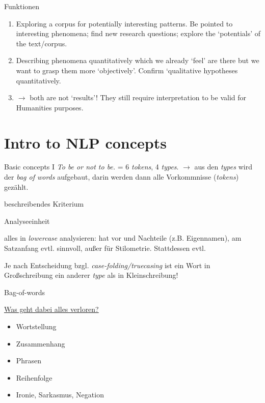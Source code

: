 \documentclass[10pt]{beamer}
\begin{document}
\begin{frame}{Funktionen}
\begin{enumerate}
    \item {} Exploring a corpus for potentially interesting patterns. Be pointed to interesting phenomena; find new research questions; explore the `potentials' of the text/corpus.
    \item {} Describing phenomena quantitatively which we already `feel' are there but we want to grasp them more `objectively'. Confirm `qualitative hypotheses quantitatively.
    \item $\to$ both are not `results'! They still require interpretation to be valid for Humanities purposes.
\end{enumerate}
\end{frame}






\section{Intro to NLP concepts}

\begin{frame}[allowframebreaks]{Basic concepts I}
\emph{To be or not to be.} = 6 \emph{tokens}, 4 \emph{types}.
$\to$ aus den \emph{types} wird der \emph{bag of words} aufgebaut, darin werden dann alle Vorkommnisse (\emph{tokens}) gezählt.

 beschreibendes Kriterium

 Analyseeinheit

 alles in \emph{lowercase} analysieren: hat vor und Nachteile (z.B. Eigennamen), am Satzanfang evtl. sinnvoll, außer für Stilometrie. Stattdessen evtl.

Je nach Entscheidung bzgl. \emph{case-folding/truecasing} ist ein Wort in Großschreibung ein anderer \emph{type} als in Kleinschreibung!
\end{frame}

\begin{frame}[allowframebreaks]{Bag-of-words}

\underline{Was geht dabei alles verloren?}
\begin{itemize}
    \item Wortstellung
    \item Zusammenhang
    \item Phrasen
    \item Reihenfolge
    \item Ironie, Sarkasmus, Negation
\end{itemize}
\end{frame}
\end{document}
